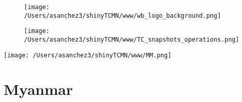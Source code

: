 \documentclass{article}\usepackage[]{graphicx}\usepackage[]{color}
\begin{document}
\newpage
\begin{figure}
  \vspace{-3ex} %
  \hspace{-7ex} %
  \texttt{[image: /Users/asanchez3/shinyTCMN/www/wb\_logo\_background.png]}
\end{figure}
\begin{figure}
  \begin{minipage}[t]{0.99\textwidth} %
      \vspace{-30ex}
      \hspace{-2ex}
      \raggedright{\texttt{[image: /Users/asanchez3/shinyTCMN/www/TC\_snapshots\_operations.png]}}
  \end{minipage}
\end{figure}
%
\begin{minipage}[t]{0.99\textwidth} %
  \vspace{-1.5cm}
  \begin{minipage}[c]{0.36\textwidth} 
    \begin{minipage}[c]{0.28\textwidth} %
      \texttt{[image: /Users/asanchez3/shinyTCMN/www/MM.png]}
    \end{minipage}
    \begin{minipage}[c]{0.70\textwidth} %
      \section*{\color{blue!40!black}Myanmar}
    \end{minipage}
  \end{minipage}
  \begin{minipage}[c]{0.63\textwidth}
  \end{minipage}  
\end{minipage} %
\end{document}
